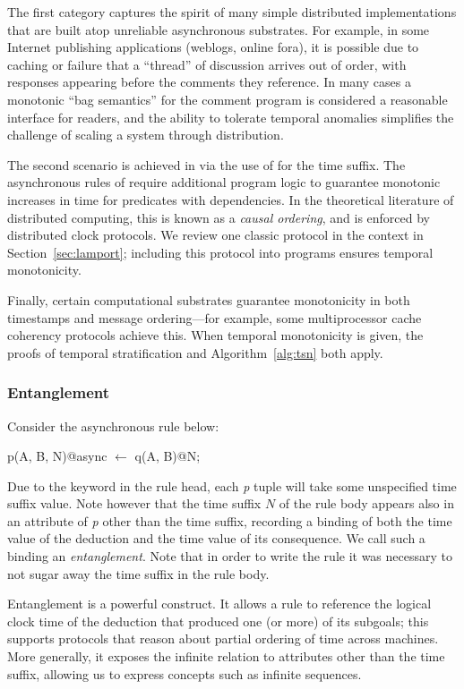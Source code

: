 The first category captures the spirit of many simple distributed implementations that are built atop unreliable asynchronous substrates.  For example, in some Internet publishing applications (weblogs, online fora), it is possible due to caching or failure that a ``thread'' of discussion arrives out of order, with responses appearing before the comments they reference.  In many cases a monotonic ``bag semantics'' for the comment program is considered a reasonable interface for readers, and the ability to tolerate temporal anomalies simplifies the challenge of scaling a system through distribution.

The second scenario is achieved in \slang via the use of  for the time suffix. The asynchronous rules of \lang require additional program logic to guarantee monotonic increases in time for predicates with dependencies.  In the theoretical literature of distributed computing, this is known as a {\em causal ordering}, and is enforced by distributed clock protocols.  We review one classic protocol in the \lang context in Section~\ref{sec:lamport}; including this protocol into \lang programs ensures temporal monotonicity.

Finally, certain computational substrates guarantee monotonicity in both timestamps and message ordering---for example, some multiprocessor cache coherency protocols achieve this.  When temporal monotonicity is given, the proofs of temporal stratification and Algorithm~\ref{alg:tsn} both apply.

\subsubsection{Entanglement}
\label{sec:entangle}
Consider the asynchronous rule below:

\begin{Dedalus}
p(A, B, N)@async \(\leftarrow\)
  q(A, B)@N;
\end{Dedalus}
\noindent
Due to the  keyword in the rule head, each \emph{p} tuple will take some unspecified time suffix value.
Note however that the time suffix $N$ of the rule body appears also in an attribute of \emph{p} other than the time suffix, recording a 
binding of both the time value of the deduction and the time value of its consequence.  We call such a binding
an \emph{entanglement}.   Note that in order
to write the rule it was necessary to not sugar away the time suffix in the rule body.  

Entanglement is a powerful construct.  It allows a rule
to reference the logical clock time of the deduction that produced one
(or more) of its subgoals; this supports protocols that reason about partial ordering of time across machines.  More generally, it exposes the infinite  relation to attributes other than the time suffix, allowing us to express concepts such as infinite sequences.

